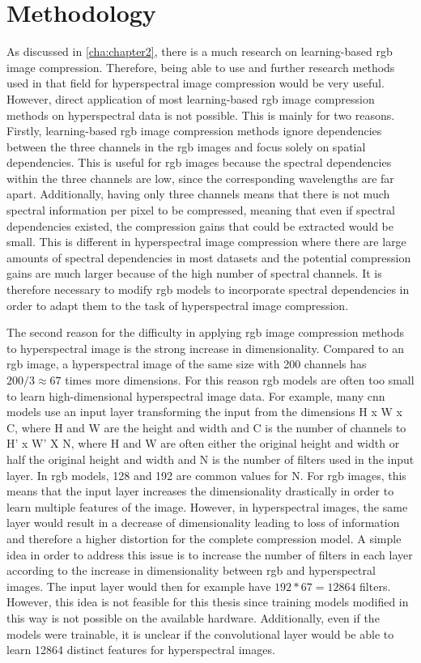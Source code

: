 \chapter{Methodology\label{cha:chapter4}}
As discussed in \autoref{cha:chapter2}, there is a much research on learning-based \ac{rgb} image compression. Therefore, being able to use and further research methods used in that field for hyperspectral image compression would be very useful. However, direct application of most learning-based \ac{rgb} image compression methods on hyperspectral data is not possible. This is mainly for two reasons. Firstly, learning-based \ac{rgb} image compression methods ignore dependencies between the three channels in the \ac{rgb} images and focus solely on spatial dependencies. This is useful for \ac{rgb} images because the spectral dependencies within the three channels are low, since the corresponding wavelengths are far apart. Additionally, having only three channels means that there is not much spectral information per pixel to be compressed, meaning that even if spectral dependencies existed, the compression gains that could be extracted would be small. This is different in hyperspectral image compression where there are large amounts of spectral dependencies in most datasets and the potential compression gains are much larger because of the high number of spectral channels. It is therefore necessary to modify \ac{rgb} models to incorporate spectral dependencies in order to adapt them to the task of hyperspectral image compression. 

The second reason for the difficulty in applying \ac{rgb} image compression methods to hyperspectral image is the strong increase in dimensionality. Compared to an \ac{rgb} image, a hyperspectral image of the same size with 200 channels has $200/3 \approx 67$ times more dimensions. For this reason \ac{rgb} models are often too small to learn high-dimensional hyperspectral image data. For example, many \ac{cnn} models use an input layer transforming the input from the dimensions H x W x C, where H and W are the height and width and C is the number of channels to H' x W' X N, where H and W are often either the original height and width or half the original height and width and N is the number of filters used in the input layer. In \ac{rgb} models, 128 and 192 are common values for N. For \ac{rgb} images, this means that the input layer increases the dimensionality drastically in order to learn multiple features of the image. However, in hyperspectral images, the same layer would result in a decrease of dimensionality leading to loss of information and therefore a higher distortion for the complete compression model. A simple idea in order to address this issue is to increase the number of filters in each layer according to the increase in dimensionality between \ac{rgb} and hyperspectral images. The input layer would then for example have $192 * 67 = 12864$ filters. However, this idea is not feasible for this thesis since training models modified in this way is not possible on the available hardware. Additionally, even if the models were trainable, it is unclear if the convolutional layer would be able to learn 12864 distinct features for hyperspectral images.

